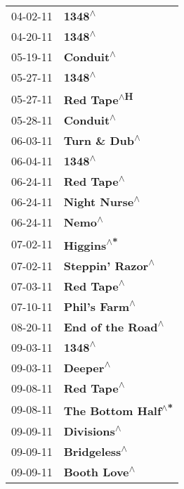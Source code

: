 \begin{supertabular}{p{0.25\columnwidth}p{0.75\columnwidth}}
 04-02-11 &                        \textbf{1348\textsuperscript{$\wedge$}} \\
 04-20-11 &                        \textbf{1348\textsuperscript{$\wedge$}} \\
 05-19-11 &                     \textbf{Conduit\textsuperscript{$\wedge$}} \\
 05-27-11 &                        \textbf{1348\textsuperscript{$\wedge$}} \\
 05-27-11 &                   \textbf{Red Tape\textsuperscript{$\wedge$H}} \\
 05-28-11 &                     \textbf{Conduit\textsuperscript{$\wedge$}} \\
 06-03-11 &                 \textbf{Turn \& Dub\textsuperscript{$\wedge$}} \\
 06-04-11 &                        \textbf{1348\textsuperscript{$\wedge$}} \\
 06-24-11 &                    \textbf{Red Tape\textsuperscript{$\wedge$}} \\
 06-24-11 &                 \textbf{Night Nurse\textsuperscript{$\wedge$}} \\
 06-24-11 &                        \textbf{Nemo\textsuperscript{$\wedge$}} \\
 07-02-11 &                    \textbf{Higgins\textsuperscript{$\wedge$*}} \\
 07-02-11 &              \textbf{Steppin' Razor\textsuperscript{$\wedge$}} \\
 07-03-11 &                    \textbf{Red Tape\textsuperscript{$\wedge$}} \\
 07-10-11 &                 \textbf{Phil's Farm\textsuperscript{$\wedge$}} \\
 08-20-11 &             \textbf{End of the Road\textsuperscript{$\wedge$}} \\
 09-03-11 &                        \textbf{1348\textsuperscript{$\wedge$}} \\
 09-03-11 &                      \textbf{Deeper\textsuperscript{$\wedge$}} \\
 09-08-11 &                    \textbf{Red Tape\textsuperscript{$\wedge$}} \\
 09-08-11 &            \textbf{The Bottom Half\textsuperscript{$\wedge$*}} \\
 09-09-11 &                   \textbf{Divisions\textsuperscript{$\wedge$}} \\
 09-09-11 &                  \textbf{Bridgeless\textsuperscript{$\wedge$}} \\
 09-09-11 &                  \textbf{Booth Love\textsuperscript{$\wedge$}} \\

\end{supertabular}
